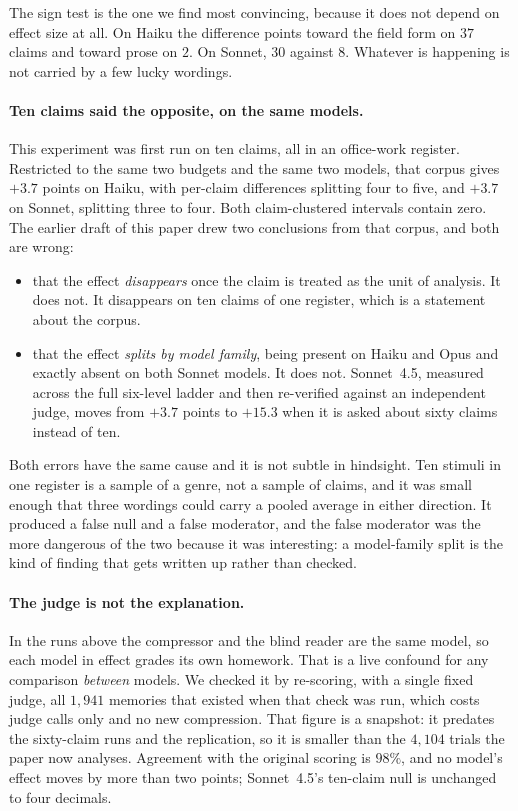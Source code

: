 \documentclass[11pt]{article}
\begin{document}
The sign test is the one we find most convincing, because it does not depend on effect
size at all. On Haiku the difference points toward the field form on $37$ claims and
toward prose on $2$. On Sonnet, $30$ against $8$. Whatever is happening is not carried by
a few lucky wordings.

\paragraph{Ten claims said the opposite, on the same models.} This experiment was first
run on ten claims, all in an office-work register. Restricted to the same two budgets and
the same two models, that corpus gives $+3.7$ points on Haiku, with per-claim differences
splitting four to five, and $+3.7$ on Sonnet, splitting three to four. Both
claim-clustered intervals contain zero. The earlier draft of this paper drew two
conclusions from that corpus, and both are wrong:

\begin{itemize}\itemsep2pt
\item that the effect \emph{disappears} once the claim is treated as the unit of
      analysis. It does not. It disappears on ten claims of one register, which is a
      statement about the corpus.
\item that the effect \emph{splits by model family}, being present on Haiku and Opus and
      exactly absent on both Sonnet models. It does not. Sonnet~4.5, measured across
      the full six-level ladder and then re-verified against an independent judge, moves
      from $+3.7$ points to $+15.3$ when it is asked about sixty claims instead of ten.
\end{itemize}

Both errors have the same cause and it is not subtle in hindsight. Ten stimuli in one
register is a sample of a genre, not a sample of claims, and it was small enough that
three wordings could carry a pooled average in either direction. It produced a false
null and a false moderator, and the false moderator was the more dangerous of the two
because it was interesting: a model-family split is the kind of finding that gets
written up rather than checked.

\paragraph{The judge is not the explanation.} In the runs above the compressor and the
blind reader are the same model, so each model in effect grades its own homework. That is
a live confound for any comparison \emph{between} models. We checked it by re-scoring, with
a single fixed judge, all $1{,}941$ memories that existed when that check was run, which
costs judge calls only and no new compression. That figure is a snapshot: it predates the
sixty-claim runs and the replication, so it is smaller than the $4{,}104$ trials the paper
now analyses. Agreement with the original scoring is $98\%$, and no model's effect moves by
more than two points; Sonnet~4.5's ten-claim null is unchanged to four decimals.
\end{document}
